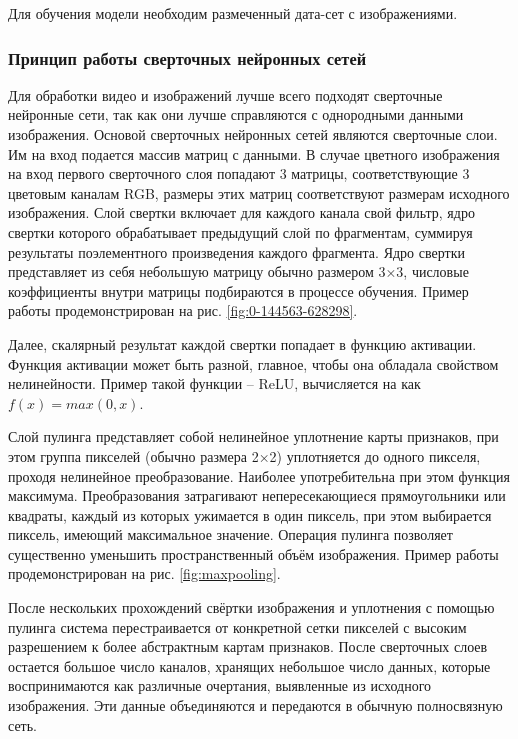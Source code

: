 \documentclass[a4paper,14pt]{article}
\begin{document}
Для обучения модели необходим размеченный дата-сет с изображениями.

\subsubsection{Принцип работы сверточных нейронных сетей}

Для обработки видео и изображений лучше всего подходят сверточные нейронные сети, так как они лучше справляются с однородными данными изображения.
Основой сверточных нейронных сетей являются сверточные слои.
Им на вход подается массив матриц с данными.
В случае цветного изображения на вход первого сверточного слоя попадают 3 матрицы, соответствующие 3 цветовым каналам RGB, размеры этих матриц соответствуют размерам исходного изображения.
Слой свертки включает для каждого канала свой фильтр, ядро свертки которого обрабатывает предыдущий слой по фрагментам, суммируя результаты поэлементного произведения каждого фрагмента.
Ядро свертки представляет из себя небольшую матрицу обычно размером 3×3, числовые коэффициенты внутри матрицы подбираются в процессе обучения.
Пример работы продемонстрирован на рис. \ref{fig:0-144563-628298}.

Далее, скалярный результат каждой свертки попадает в функцию активации.
Функция активации может быть разной, главное, чтобы она обладала свойством нелинейности.
Пример такой функции -- ReLU, вычисляется на как $f(x) = max(0,x)$.

Слой пулинга представляет собой нелинейное уплотнение карты признаков, при этом группа пикселей (обычно размера 2×2) уплотняется до одного пикселя, проходя нелинейное преобразование.
Наиболее употребительна при этом функция максимума.
Преобразования затрагивают непересекающиеся прямоугольники или квадраты, каждый из которых ужимается в один пиксель, при этом выбирается пиксель, имеющий максимальное значение.
Операция пулинга позволяет существенно уменьшить пространственный объём изображения. 
Пример работы продемонстрирован на рис. \ref{fig:maxpooling}.

После нескольких прохождений свёртки изображения и уплотнения с помощью пулинга система перестраивается от конкретной сетки пикселей с высоким разрешением к более абстрактным картам признаков.
После сверточных слоев остается большое число каналов, хранящих небольшое число данных, которые воспринимаются как различные очертания, выявленные из исходного изображения.
Эти данные объединяются и передаются в обычную полносвязную сеть.
\end{document}
